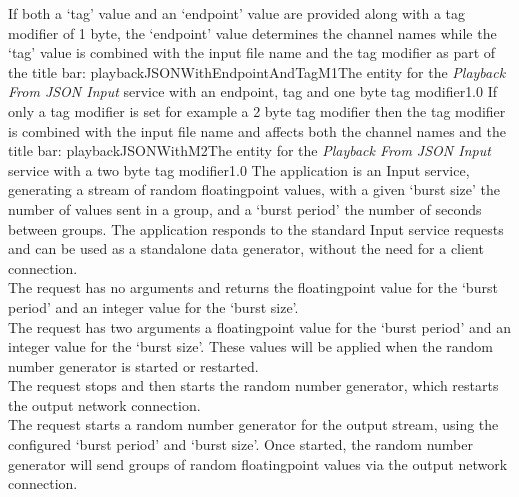 If both a `tag' value and an `endpoint' value are provided along with a tag modifier of 1
byte, the `endpoint' value determines the channel names while the `tag' value is combined
with the input file name and the tag modifier as part of the title bar:
%
{playbackJSONWithEndpointAndTagM1}{The \emph{\MMMU} entity for the \emph{Playback From
JSON Input} service with an endpoint, tag and one byte tag modifier}{1.0}
\condPage{}
If only a tag modifier is set \longDash{} for example a 2 byte tag modifier \longDash{}
then the tag modifier is combined with the input file name and affects both the channel
names and the title bar:
%
{playbackJSONWithM2}{The \emph{\MMMU} entity for the \emph{Playback From JSON Input}
service with a two byte tag modifier}{1.0}
The  application is an Input service,
generating a stream of random floating\longDash{}point values, with a given `burst size'
\longDash{} the number of values sent in a group, and a `burst period' \longDash{} the
number of seconds between groups.
The application responds to the standard Input service requests and can be used as a
standalone data generator, without the need for a client connection.\\

The  request has no arguments and
returns the floating\longDash{}point value for the `burst period' and an integer value for
the `burst size'.\\

The  request has two arguments
\longDash{} a floating\longDash{}point value for the `burst period' and an integer value
for the `burst size'.
These values will be applied when the random number generator is started or restarted.\\

The  request stops and then
starts the random number generator, which restarts the output \yarp{} network
connection.\\

The  request starts a random
number generator for the output stream, using the configured `burst period' and
`burst size'.
Once started, the random number generator will send groups of random
floating\longDash{}point values via the output \yarp{} network connection.\\

